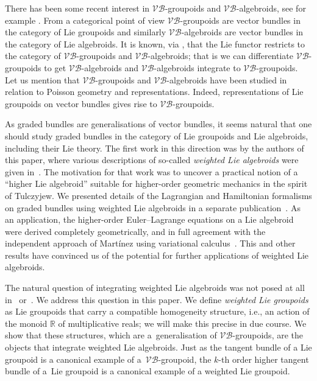 \documentclass[10pt,a4paper]{amsart}
\numberwithin{equation}{section}
\begin{document}
There has been some recent interest in $\mathcal{VB}$-groupoids and $\mathcal{VB}$-algebroids, see for example \cite{Brahic:2014,Bursztyn:2014,Gracia-Saz:2009,Gracia-Saz:2010}.  From a categorical point of view $\mathcal{VB}$-groupoids are vector bundles in the category of Lie groupoids and similarly $\mathcal{VB}$-algebroids are vector bundles in the category of Lie algebroids.   It is known, via \cite{Brahic:2014,Bursztyn:2014}, that the Lie functor restricts to the category of  $\mathcal{VB}$-groupoids and $\mathcal{VB}$-algebroids; that is we can dif\/ferentiate  $\mathcal{VB}$-groupoids to get $\mathcal{VB}$-algebroids and $\mathcal{VB}$-algebroids integrate to $\mathcal{VB}$-groupoids. Let us mention that $\mathcal{VB}$-groupoids and  $\mathcal{VB}$-algebroids have been studied in relation to Poisson geometry and representations. Indeed, representations of Lie groupoids on vector bundles gives rise to $\mathcal{VB}$-groupoids.

As graded bundles are generalisations of vector bundles, it seems natural that one should study graded bundles in the category of Lie groupoids and  Lie algebroids, including their Lie theory. The f\/irst work in this direction was by the authors of this paper, where various descriptions of so-called \emph{weighted Lie algebroids} were given in~\cite{Bruce:2014}. The motivation for that work was to uncover a practical notion of a ``higher Lie algebroid'' suitable for higher-order geometric mechanics in the spirit of Tulczyjew. We presented details of the Lagrangian and Hamiltonian formalisms on graded bundles using weighted Lie algebroids in a separate publication~\cite{Bruce:2014b}. As an application, the higher-order Euler--Lagrange equations on a Lie algebroid were derived completely geometrically, and in full agreement with the independent   approach of Mart\'{i}nez using variational calculus~\cite{Martinez:2015}. This and other results have convinced us of the potential for further applications of weighted Lie algebroids.

The natural question of integrating weighted Lie algebroids was not posed at all in~\cite{Bruce:2014} or~\cite{Bruce:2014b}. We address this question in this paper. We  def\/ine \emph{weighted Lie groupoids} as Lie groupoids that carry a compatible homogeneity structure, i.e., an action of the monoid ${\mathbb R}$ of multiplicative reals; we will make this precise in due course.   We show that these structures, which are a~generalisation of $\mathcal{VB}$-groupoids, are the objects that integrate weighted Lie algebroids.   Just as the tangent bundle of a Lie groupoid is a canonical example of a~$\mathcal{VB}$-groupoid,  the $k$-th order  higher tangent bundle of a~Lie groupoid is a canonical example of a weighted Lie groupoid.
\end{document}
